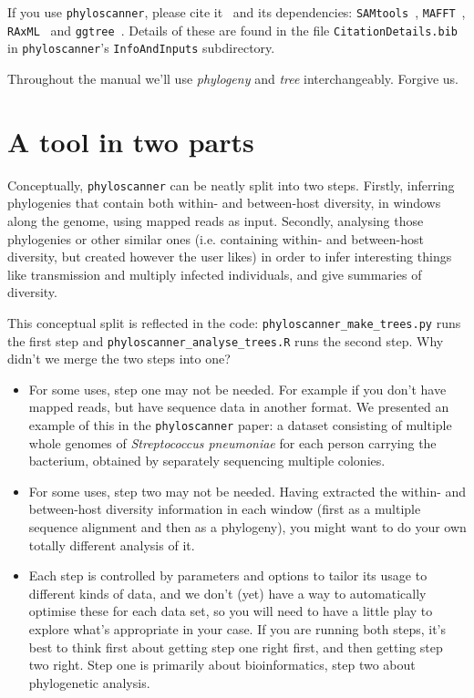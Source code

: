 \documentclass{article}
\newcommand{\p}{\texttt{phyloscanner}\xspace}
\newcommand{\pmt}{\texttt{phyloscanner\_make\_trees.py}\xspace}
\newcommand{\pat}{\texttt{phyloscanner\_analyse\_trees.R}\xspace}
\let\c\texttt
\newcommand{\R}{\c{RAxML}\xspace}
\begin{document}
\vspace*{5mm}

If you use \p, please cite it~\cite{Wymant157768} and its dependencies: \c{SAMtools}~\cite{Li08062009}, \c{MAFFT}~\cite{Katoh15072002}, \R~\cite{doi:10.1093/bioinformatics/btu033} and \c{ggtree}~\cite{MEE3:MEE312628}.
Details of these are found in the file \c{CitationDetails.bib} in \p's \c{InfoAndInputs} subdirectory.

\vspace*{5mm}

Throughout the manual we'll use {\it phylogeny} and {\it tree} interchangeably.
Forgive us.

\newpage
\tableofcontents
\newpage

\section*{A tool in two parts}
Conceptually, \p can be neatly split into two steps.
Firstly, inferring phylogenies that contain both within- and between-host diversity, in windows along the genome, using mapped reads as input.
Secondly, analysing those phylogenies or other similar ones (i.e. containing within- and between-host diversity, but created however the user likes) in order to infer interesting things like transmission and multiply infected individuals, and give summaries of diversity.

This conceptual split is reflected in the code: \pmt runs the first step and \pat runs the second step.
Why didn't we merge the two steps into one?
\begin{itemize}
\item For some uses, step one may not be needed.
For example if you don't have mapped reads, but have sequence data in another format.
We presented an example of this in the \p paper: a dataset consisting of multiple whole genomes of {\it Streptococcus pneumoniae} for each person carrying the bacterium, obtained by separately sequencing multiple colonies.
\item For some uses, step two may not be needed.
Having extracted the within- and between-host diversity information in each window (first as a multiple sequence alignment and then as a phylogeny), you might want to do your own totally different analysis of it.
\item Each step is controlled by parameters and options to tailor its usage to different kinds of data, and we don't (yet) have a way to automatically optimise these for each data set, so you will need to have a little play to explore what's appropriate in your case.
If you are running both steps, it's best to think first about getting step one right first, and then getting step two right.
Step one is primarily about bioinformatics, step two about phylogenetic analysis.
\end{itemize}
\end{document}
